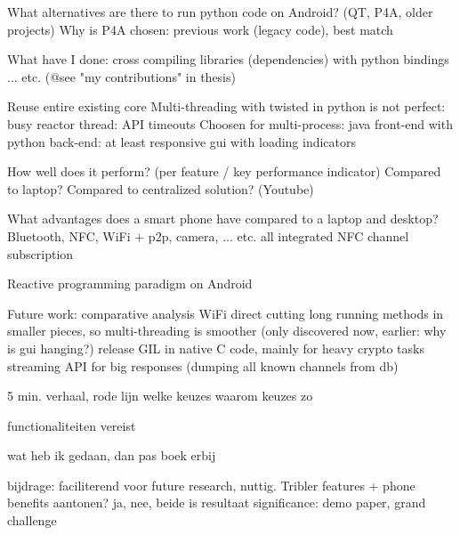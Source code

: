What alternatives are there to run python code on Android? (QT, P4A, older projects)
Why is P4A chosen: previous work (legacy code), best match

What have I done: cross compiling libraries (dependencies) with python bindings
... etc. (@see "my contributions" in thesis)


Reuse entire existing core
Multi-threading with twisted in python is not perfect: busy reactor thread: API timeouts
Choosen for multi-process: java front-end with python back-end: at least responsive gui with loading indicators



How well does it perform? (per feature / key performance indicator)
Compared to laptop?
Compared to centralized solution? (Youtube)

What advantages does a smart phone have compared to a laptop and desktop?
Bluetooth, NFC, WiFi + p2p, camera, ... etc. all integrated
NFC channel subscription

Reactive programming paradigm on Android

Future work:
comparative analysis
WiFi direct
cutting long running methods in smaller pieces, so multi-threading is smoother (only discovered now, earlier: why is gui hanging?)
release GIL in native C code, mainly for heavy crypto tasks
streaming API for big responses (dumping all known channels from db)



5 min. verhaal, rode lijn
welke keuzes
waarom keuzes zo

functionaliteiten vereist


wat heb ik gedaan, dan pas boek erbij


bijdrage: faciliterend voor future research, nuttig. Tribler features + phone benefits
aantonen? ja, nee, beide is resultaat
significance: demo paper, grand challenge

